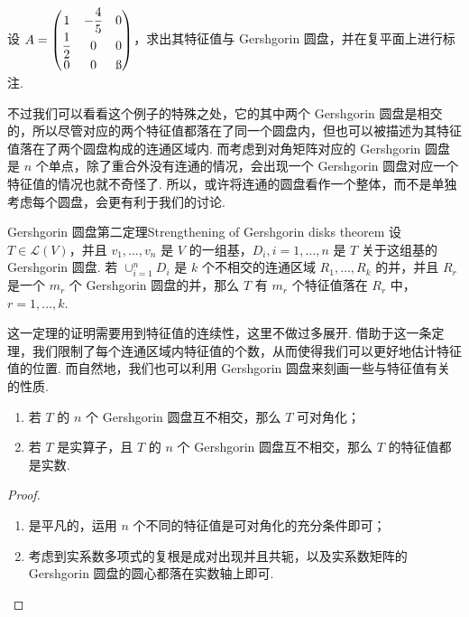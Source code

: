 \begin{example}{}{}
    设 $A = \begin{pmatrix}
            1           & -\dfrac{4}{5} & 0  \\
            \dfrac{1}{2} & 0            & 0  \\
            0           & 0            & \i
        \end{pmatrix}$，求出其特征值与 Gershgorin 圆盘，并在复平面上进行标注.
\end{example}

不过我们可以看看这个例子的特殊之处，它的其中两个 Gershgorin 圆盘是相交的，所以尽管对应的两个特征值都落在了同一个圆盘内，但也可以被描述为其特征值落在了两个圆盘构成的连通区域内. 而考虑到对角矩阵对应的 Gershgorin 圆盘是 $n$ 个单点，除了重合外没有连通的情况，会出现一个 Gershgorin 圆盘对应一个特征值的情况也就不奇怪了. 所以，或许将连通的圆盘看作一个整体，而不是单独考虑每个圆盘，会更有利于我们的讨论.

\begin{theorem}{Gershgorin 圆盘第二定理}{Strengthening of Gershgorin disks theorem}
    设 $T \in \mathcal{L}(V)$，并且 $v_1, \ldots, v_n$ 是 $V$ 的一组基，$D_i, i = 1, \ldots, n$ 是 $T$ 关于这组基的 Gershgorin 圆盘. 若 $\cup_{i = 1}^n D_i$ 是 $k$ 个不相交的连通区域 $R_1, \ldots, R_k$ 的并，并且 $R_r$ 是一个 $m_r$ 个 Gershgorin 圆盘的并，那么 $T$ 有 $m_r$ 个特征值落在 $R_r$ 中，$r = 1, \ldots, k$.
\end{theorem}

这一定理的证明需要用到特征值的连续性，这里不做过多展开. 借助于这一条定理，我们限制了每个连通区域内特征值的个数，从而使得我们可以更好地估计特征值的位置. 而自然地，我们也可以利用 Gershgorin 圆盘来刻画一些与特征值有关的性质.

\begin{corollary}{}{}
    \begin{enumerate}
        \item 若 $T$ 的 $n$ 个 Gershgorin 圆盘互不相交，那么 $T$ 可对角化；
        \item 若 $T$ 是实算子，且 $T$ 的 $n$ 个 Gershgorin 圆盘互不相交，那么 $T$ 的特征值都是实数.
    \end{enumerate}
\end{corollary}

\begin{proof}
    \begin{enumerate}
        \item 是平凡的，运用 $n$ 个不同的特征值是可对角化的充分条件即可；
        \item 考虑到实系数多项式的复根是成对出现并且共轭，以及实系数矩阵的 Gershgorin 圆盘的圆心都落在实数轴上即可.
    \end{enumerate}
\end{proof}

